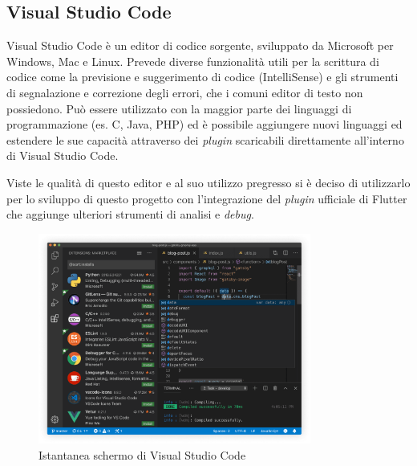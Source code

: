 \subsection{Visual Studio Code}
Visual Studio Code è un editor di codice sorgente, sviluppato da Microsoft per Windows, Mac e Linux. Prevede diverse funzionalità utili per la scrittura di codice come la previsione e suggerimento di codice (IntelliSense) e gli strumenti di segnalazione e correzione degli errori, che i comuni editor di testo non possiedono.
Può essere utilizzato con la maggior parte dei linguaggi di programmazione (es. C, Java, PHP) ed è possibile aggiungere nuovi linguaggi ed estendere le sue capacità attraverso dei \textit{plugin} scaricabili direttamente all'interno di Visual Studio Code.

Viste le qualità di questo editor e al suo utilizzo pregresso si è deciso di utilizzarlo per lo sviluppo di questo progetto con l'integrazione del \textit{plugin} ufficiale di Flutter che aggiunge ulteriori strumenti di analisi e \textit{debug}.

\begin{figure}
    \centering
    \includegraphics[width=0.8\textwidth]{img/vsCode-screenshot.png}
    \caption{Istantanea schermo di Visual Studio Code}
    \label{fig:vsCodeScreen}
\end{figure}